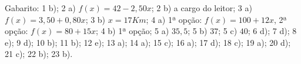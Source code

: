  Gabarito: 1 b); 2 a) $f(x)= 42 - 2,50 x$; 2 b) a cargo do leitor; 3 a) $f(x)= 3,50 + 0,80 x$; 3 b) $x= 17 Km$; 4 a) 1ª opção: $f(x)= 100 + 12x$, 2ª opção: $f(x)= 80+15x$; 4 b) 1ª opção; 5 a) $35,5$; 5 b) $37$; 5 c) $40$; 6 d); 7 d); 8 e); 9 d); 10 b); 11 b); 12 e); 13 a); 14 a); 15 c); 16 a); 17 d); 18 c); 19 a); 20 d); 21 c); 22 b); 23 b).

